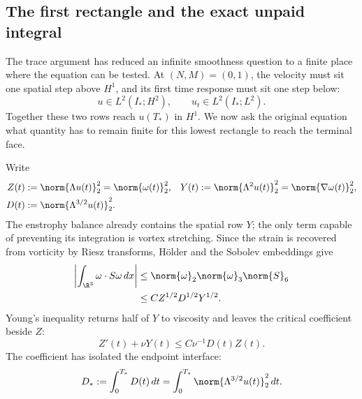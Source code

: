 \subsection{The first rectangle and the exact unpaid integral}\label{sub:BodyCompatibleIntersection}

The trace argument has reduced an infinite smoothness question to a finite
place where the equation can be tested.  At \((N,M)=(0,1)\), the velocity must
sit one spatial step above \(H^1\), and its first time response must sit one
step below:
\begin{equation}\label{eq:BodyFirstWholeTerminalRectangle}
  u\in L^2(I_*;H^2),
  \qquad
  u_t\in L^2(I_*;L^2).
\end{equation}
Together these two rows reach \(u(T_*)\) in \(H^1\).  We now ask the original
equation what quantity has to remain finite for this lowest rectangle to reach
the terminal face.

Write
\begin{equation}\label{eq:BodyEnstrophyDissipationQuantities}
\begin{aligned}
  Z(t)&:=\norm{\Lambda u(t)}_2^2=\norm{\omega(t)}_2^2,
  &
  Y(t)&:=\norm{\Lambda^2u(t)}_2^2=\norm{\nabla\omega(t)}_2^2,
  \\
  D(t)&:=\norm{\Lambda^{3/2}u(t)}_2^2.
\end{aligned}
\end{equation}
The enstrophy balance already contains the spatial row \(Y\); the only term
capable of preventing its integration is vortex stretching.  Since the strain
is recovered from vorticity by Riesz transforms, H\"older and the Sobolev
embeddings give
\begin{align}
  \left|\int_{\R^3}\omega\cdot S\omega\,dx\right|
  &\leq
  \norm{\omega}_2\norm{\omega}_3\norm{S}_6
  \notag\\
  &\leq C Z^{1/2}D^{1/2}Y^{1/2}.
  \label{eq:BodyFirstRectangleStretchingEstimate}
\end{align}
Young's inequality returns half of \(Y\) to viscosity and leaves the critical
coefficient beside \(Z\):
\begin{equation}\label{eq:BodyEnstrophyFromCriticalDissipation}
  Z'(t)+\nu Y(t)
  \leq C\nu^{-1}D(t)Z(t).
\end{equation}
The coefficient has isolated the endpoint interface:
\begin{equation}\label{eq:BodyCriticalDissipationInterface}
  D_*:=\int_0^{T_*}D(t)\,dt
  =\int_0^{T_*}\norm{\Lambda^{3/2}u(t)}_2^2\,dt.
\end{equation}

